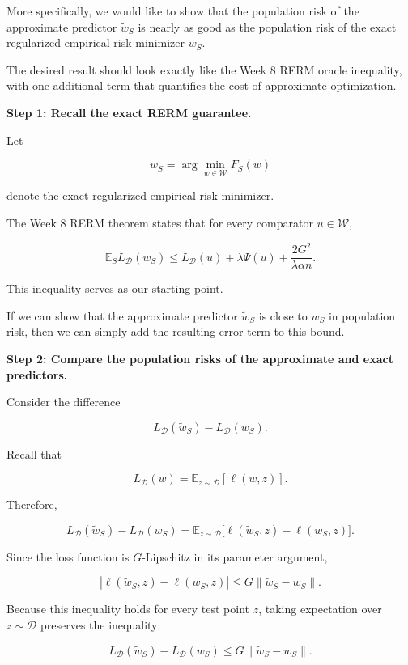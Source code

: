 \documentclass[11pt]{article}
\newcommand{\E}{\mathbb{E}}
\begin{document}
\begin{enumerate}
\begin{solutionbox}
More specifically, we would like to show that the population risk of the approximate predictor \(\widetilde w_S\) is nearly as good as the population risk of the exact regularized empirical risk minimizer \(w_S\).

The desired result should look exactly like the Week 8 RERM oracle inequality, with one additional term that quantifies the cost of approximate optimization.

\medskip

\textbf{Step 1: Recall the exact RERM guarantee.}

Let

\[
w_S
=
\arg\min_{w\in\mathcal W}
F_S(w)
\]

denote the exact regularized empirical risk minimizer.

The Week 8 RERM theorem states that for every comparator \(u\in\mathcal W\),

\[
\E_S
L_{\mathcal D}(w_S)
\le
L_{\mathcal D}(u)
+
\lambda\Psi(u)
+
\frac{2G^2}{\lambda\alpha n}.
\]

This inequality serves as our starting point.

If we can show that the approximate predictor \(\widetilde w_S\) is close to \(w_S\) in population risk, then we can simply add the resulting error term to this bound.

\medskip

\textbf{Step 2: Compare the population risks of the approximate and exact predictors.}

Consider the difference

\[
L_{\mathcal D}(\widetilde w_S)
-
L_{\mathcal D}(w_S).
\]

Recall that

\[
L_{\mathcal D}(w)
=
\E_{z\sim\mathcal D}
[\ell(w,z)].
\]

Therefore,

\[
L_{\mathcal D}(\widetilde w_S)
-
L_{\mathcal D}(w_S)
=
\E_{z\sim\mathcal D}
\Big[
\ell(\widetilde w_S,z)
-
\ell(w_S,z)
\Big].
\]

Since the loss function is \(G\)-Lipschitz in its parameter argument,

\[
|\ell(\widetilde w_S,z)-\ell(w_S,z)|
\le
G
\|
\widetilde w_S-w_S
\|.
\]

Because this inequality holds for every test point \(z\), taking expectation over \(z\sim\mathcal D\) preserves the inequality:

\[
L_{\mathcal D}(\widetilde w_S)
-
L_{\mathcal D}(w_S)
\le
G
\|
\widetilde w_S-w_S
\|.
\]


\end{solutionbox}
\end{enumerate}
\end{document}

